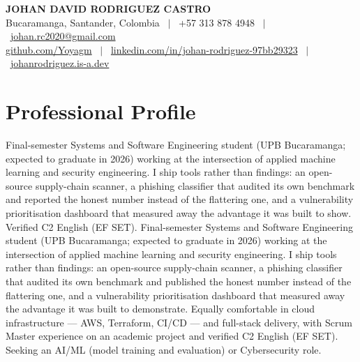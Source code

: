 %
%

\begin{center}
  {\sffamily\bfseries\color{accent}\fontsize{18}{21}\selectfont
   JOHAN DAVID RODRIGUEZ CASTRO}\\[0.5ex]
  {\footnotesize\color{subtle}
   Bucaramanga, Santander, Colombia
   \ $\vert$ \ +57 313 878 4948
   \ $\vert$ \ \href{mailto:johan.rc2020@gmail.com}{johan.rc2020@gmail.com}}\\[0.4ex]
  {\footnotesize
   \href{https://github.com/Yoyagm}{github.com/Yoyagm}
   \ {\color{subtle}$\vert$} \
   \href{https://www.linkedin.com/in/johan-rodriguez-97bb29323/}{linkedin.com/in/johan-rodriguez-97bb29323}
   \ {\color{subtle}$\vert$} \
   \href{https://johanrodriguez.is-a.dev/en}{johanrodriguez.is-a.dev}}
\end{center}
\vspace{0.2ex}

\section{Professional Profile}
\justifying
\ifonepage
Final-semester Systems and Software Engineering student (UPB Bucaramanga; expected to graduate in 2026)
working at the intersection of applied machine learning and security engineering. I ship tools rather
than findings: an open-source supply-chain scanner, a phishing classifier that audited its own
benchmark and reported the honest number instead of the flattering one, and a vulnerability
prioritisation dashboard that measured away the advantage it was built to show. Verified C2 English
(EF SET).
\else
Final-semester Systems and Software Engineering student (UPB Bucaramanga; expected to graduate in 2026)
working at the intersection of applied machine learning and security engineering. I ship tools rather
than findings: an open-source supply-chain scanner, a phishing classifier that audited its own
benchmark and published the honest number instead of the flattering one, and a vulnerability
prioritisation dashboard that measured away the advantage it was built to demonstrate. Equally comfortable in cloud infrastructure --- AWS,
Terraform, CI/CD --- and full-stack delivery, with Scrum Master experience on an academic project and
verified C2 English (EF SET). Seeking an AI/ML (model training and evaluation) or Cybersecurity role.
\fi

